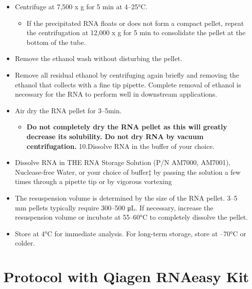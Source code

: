 \documentclass[
  letterpaper,
  DIV=11,
  numbers=noendperiod]{scrreprt}
\providecommand{\tightlist}{%
  \setlength{\itemsep}{0pt}\setlength{\parskip}{0pt}}\usepackage{longtable,booktabs,array}
\begin{document}
\begin{enumerate}
  \begin{itemize}
  \item
    Centrifuge at 7,500 x g for 5 min at 4--25°C.

    \begin{itemize}
    \tightlist
    \item
      If the precipitated RNA floats or does not form a compact pellet,
      repeat the centrifugation at 12,000 x g for 5 min to consolidate
      the pellet at the bottom of the tube.
    \end{itemize}
  \item
    Remove the ethanol wash without disturbing the pellet.
  \item
    Remove all residual ethanol by centrifuging again briefly and
    removing the ethanol that collects with a fine tip pipette. Complete
    removal of ethanol is necessary for the RNA to perform well in
    downstream applications.
  \item
    Air dry the RNA pellet for 3--5min.

    \begin{itemize}
    \tightlist
    \item
      \textbf{Do not completely dry the RNA pellet as this will greatly
      decrease its solubility. Do not dry RNA by vacuum centrifugation.}
      10.Dissolve RNA in the buffer of your choice.
    \end{itemize}
  \item
    Dissolve RNA in THE RNA Storage Solution (P/N AM7000, AM7001),
    Nuclease-free Water, or your choice of buffer‡ by passing the
    solution a few times through a pipette tip or by vigorous vortexing
  \item
    The resuspension volume is determined by the size of the RNA pellet.
    3--5 mm pellets typically require 300--500 μL. If necessary,
    increase the resuspension volume or incubate at 55--60°C to
    completely dissolve the pellet.
  \item
    Store at 4°C for immediate analysis. For long-term storage, store at
    --70°C or colder.
  \end{itemize}
\end{enumerate}

\hypertarget{protocol-with-qiagen-rnaeasy-kit}{%
\section*{\texorpdfstring{\textbf{Protocol with Qiagen RNAeasy
Kit}}{Protocol with Qiagen RNAeasy Kit}}\label{protocol-with-qiagen-rnaeasy-kit}}
\end{document}

